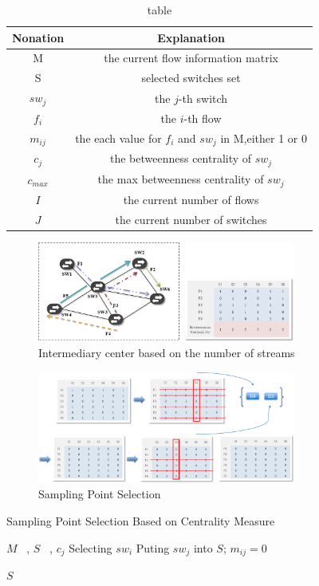 \documentclass[conference,compsoc]{IEEEtran}
\begin{document}
\begin{table}[h]
\centering
\caption{table}\label{tab:tab2}
\begin{tabular}{c|c}
\hline
Nonation & Explanation\\
\hline
\hline
M & the current flow information matrix \\
\hline
S & selected switches set \\
\hline
$sw_j$ & the $j$-th switch \\
\hline
$f_i$ & the $i$-th flow \\
\hline
$m_{ij}$ & the each value for $f_i$ and $sw_j$ in M,either 1 or 0 \\
\hline
$c_j$ & the betweenness centrality of $sw_j$  \\
\hline
$c_{max}$ & the max betweenness centrality of $sw_j$  \\
\hline
$I$ & the current number of flows  \\
\hline
$J$ & the current number of switches  \\
\hline
\hline
\end{tabular}
\end{table}

\begin{figure}[!hhhhhhhhhht]
\centering
\includegraphics[width=8.5cm]{images/png_sampling_point.png}
\caption{Intermediary center based on the number of streams}
\label{png_sampling_point.png}
\end{figure}

\begin{figure}[!hhhhhhhhhht]
\centering
\includegraphics[width=8.5cm]{images/png_sampling_point_in.png}
\caption{Sampling Point Selection}
\label{png_sampling_point_in.png}
\end{figure}

\begin{algorithm}[h]
\caption{Sampling Point Selection Based on Centrality Measure}
\begin{algorithmic}[1]
\REQUIRE  $M$ ~, $S$ ~, $c_j$
\STATE   Selecting  $sw_i$
\ENDIF
\STATE Puting $sw_j $ into  $ S $;
\label{code:TrainBase:getc}
\STATE  $m_{ij} = 0$
\ENDIF
\ENDFOR
\label{code:TrainBase:pos}
\ENDFOR
\ENDWHILE 

\RETURN $S$
\label{code:recentEnd}
\end{algorithmic}
\end{algorithm}
\end{document}
